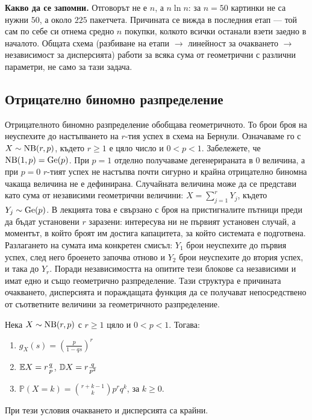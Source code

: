 \begin{supp}
\textbf{Какво да се запомни.} Отговорът не е $n$, а $n\ln n$: за $n=50$ картинки не са нужни
$50$, а около $225$ пакетчета. Причината се вижда в последния етап — той сам по себе си
отнема средно $n$ покупки, колкото всички останали взети заедно в началото. Общата схема
(разбиване на етапи $\to$ линейност за очакването $\to$ независимост за дисперсията) работи
за всяка сума от геометрични с различни параметри, не само за тази задача.
\end{supp}

\subsection{Отрицателно биномно разпределение}

Отрицателното биномно разпределение обобщава геометричното. То брои броя на неуспехите до настъпването на $r$-тия успех в схема на Бернули. Означаваме го с $X \sim \operatorname{NB}(r, p)$, където $r \ge 1$ е цяло число и $0<p<1$.
Забележете, че $\operatorname{NB}(1, p) = \operatorname{Ge}(p)$. При $p=1$ отделно получаваме дегенерираната
в $0$ величина, а при $p=0$ $r$-тият успех не настъпва почти сигурно и крайна
отрицателно биномна чакаща величина не е дефинирана.
Случайната величина може да се представи като сума от независими геометрични величини: $X = \sum_{j=1}^r Y_j$, където $Y_j \sim \operatorname{Ge}(p)$. В лекцията това е свързано с броя на пристигналите пътници преди да бъдат установени $r$ заразени: интересува ни не първият установен случай, а моментът, в който броят им достига капацитета, за който системата е подготвена.
Разлагането на сумата има конкретен смисъл: $Y_1$ брои неуспехите до първия успех, след него броенето започва отново и $Y_2$ брои неуспехите до втория успех, и така до $Y_r$. Поради независимостта на опитите тези блокове са независими и имат едно и също геометрично разпределение. Тази структура е причината очакването, дисперсията и пораждащата функция да се получават непосредствено от съответните величини за геометричното разпределение.

\begin{prop}
Нека $X \sim \operatorname{NB}(r, p)$ с $r\ge1$ цяло и $0<p<1$. Тогава:
\begin{enumerate}
    \item[а)] $g_X(s) = \left( \frac{p}{1-qs} \right)^r$
    \item[б)] $\mathbb{E} X = r\frac{q}{p}$, $\mathbb{D} X = r\frac{q}{p^2}$
    \item[в)] $\mathbb{P}(X=k) = \binom{r+k-1}{k} p^r q^k$, за $k \ge 0$.
\end{enumerate}
При тези условия очакването и дисперсията са крайни.
\end{prop}

